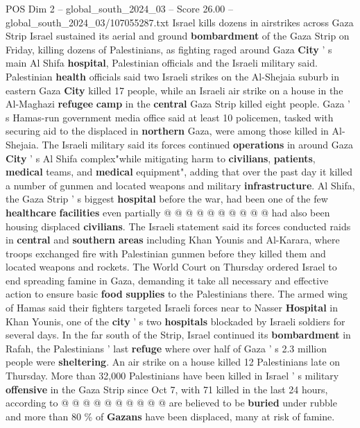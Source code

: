 \begin{textsample}{POS Dim 2 – global\_south\_2024\_03 – Score 26.00 – global\_south\_2024\_03/107055287.txt}  \label{ex:f2_pos_013}
Israel kills dozens in airstrikes across Gaza Strip Israel sustained its aerial and ground \textbf{bombardment} of the Gaza Strip on Friday, killing dozens of Palestinians, as fighting raged around Gaza \textbf{City} ' s main Al Shifa \textbf{hospital}, Palestinian officials and the Israeli military said.
Palestinian \textbf{health} officials said two Israeli strikes on the Al-Shejaia suburb in eastern Gaza \textbf{City} killed 17 people, while an Israeli air strike on a house in the Al-Maghazi \textbf{refugee} \textbf{camp} in the \textbf{central} Gaza Strip killed eight people.
Gaza ' s Hamas-run government media office said at least 10 policemen, tasked with securing aid to the displaced in \textbf{northern} Gaza, were among those killed in Al-Shejaia.
The Israeli military said its forces continued \textbf{operations} in around Gaza \textbf{City} ' s Al Shifa complex"while mitigating harm to \textbf{civilians}, \textbf{patients}, \textbf{medical} teams, and \textbf{medical} equipment", adding that over the past day it killed a number of gunmen and located weapons and military \textbf{infrastructure}.
Al Shifa, the Gaza Strip ' s biggest \textbf{hospital} before the war, had been one of the few \textbf{healthcare} \textbf{facilities} even partially @ @ @ @ @ @ @ @ @ @ had also been housing displaced \textbf{civilians}.
The Israeli statement said its forces conducted raids in \textbf{central} and \textbf{southern} \textbf{areas} including Khan Younis and Al-Karara, where troops exchanged fire with Palestinian gunmen before they killed them and located weapons and rockets.
The World Court on Thursday ordered Israel to end spreading famine in Gaza, demanding it take all necessary and effective action to ensure basic \textbf{food} \textbf{supplies} to the Palestinians there.
The armed wing of Hamas said their fighters targeted Israeli forces near to Nasser \textbf{Hospital} in Khan Younis, one of the \textbf{city} ' s two \textbf{hospitals} blockaded by Israeli soldiers for several days.
In the far south of the Strip, Israel continued its \textbf{bombardment} in Rafah, the Palestinians ' last \textbf{refuge} where over half of Gaza ' s 2.3 million people were \textbf{sheltering}.
An air strike on a house killed 12 Palestinians late on Thursday.
More than 32,000 Palestinians have been killed in Israel ' s military \textbf{offensive} in the Gaza Strip since Oct 7, with 71 killed in the last 24 hours, according to @ @ @ @ @ @ @ @ @ @ are believed to be \textbf{buried} under rubble and more than 80 \% of \textbf{Gazans} have been displaced, many at risk of famine.

\end{textsample}
